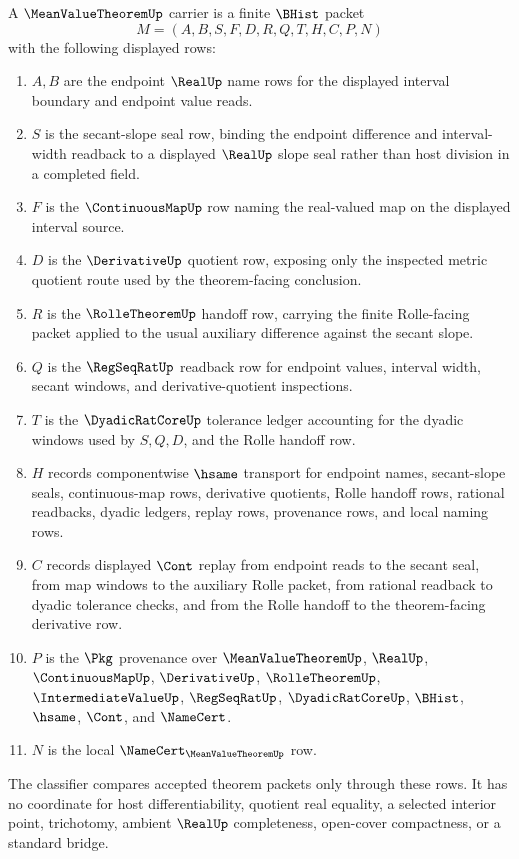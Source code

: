 \begin{definition}
\label{def:mean-value-theorem-carrier}
A $\MeanValueTheoremUp$ carrier is a finite $\BHist$ packet
$$
M=(A,B,S,F,D,R,Q,T,H,C,P,N)
$$
with the following displayed rows:
\begin{enumerate}
\item $A,B$ are the endpoint $\RealUp$ name rows for the displayed interval boundary and endpoint value reads.
\item $S$ is the secant-slope seal row, binding the endpoint difference and interval-width readback to a displayed $\RealUp$ slope seal rather than host division in a completed field.
\item $F$ is the $\ContinuousMapUp$ row naming the real-valued map on the displayed interval source.
\item $D$ is the $\DerivativeUp$ quotient row, exposing only the inspected metric quotient route used by the theorem-facing conclusion.
\item $R$ is the $\RolleTheoremUp$ handoff row, carrying the finite Rolle-facing packet applied to the usual auxiliary difference against the secant slope.
\item $Q$ is the $\RegSeqRatUp$ readback row for endpoint values, interval width, secant windows, and derivative-quotient inspections.
\item $T$ is the $\DyadicRatCoreUp$ tolerance ledger accounting for the dyadic windows used by $S,Q,D$, and the Rolle handoff row.
\item $H$ records componentwise $\hsame$ transport for endpoint names, secant-slope seals, continuous-map rows, derivative quotients, Rolle handoff rows, rational readbacks, dyadic ledgers, replay rows, provenance rows, and local naming rows.
\item $C$ records displayed $\Cont$ replay from endpoint reads to the secant seal, from map windows to the auxiliary Rolle packet, from rational readback to dyadic tolerance checks, and from the Rolle handoff to the theorem-facing derivative row.
\item $P$ is the $\Pkg$ provenance over $\MeanValueTheoremUp$, $\RealUp$, $\ContinuousMapUp$, $\DerivativeUp$, $\RolleTheoremUp$, $\IntermediateValueUp$, $\RegSeqRatUp$, $\DyadicRatCoreUp$, $\BHist$, $\hsame$, $\Cont$, and $\NameCert$.
\item $N$ is the local $\NameCert_{\MeanValueTheoremUp}$ row.
\end{enumerate}
The classifier compares accepted theorem packets only through these rows. It has no coordinate for host differentiability, quotient real equality, a selected interior point, trichotomy, ambient $\RealUp$ completeness, open-cover compactness, or a standard bridge.
\end{definition}


